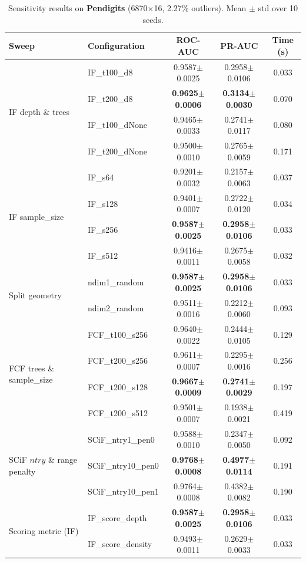\begin{table}[t]
\centering
\caption{Sensitivity results on \textbf{Pendigits} (6870$\times$16, 2.27\% outliers). Mean $\pm$ std over 10 seeds.}
\label{tab:sens-pendigits}
\scriptsize
\setlength{\tabcolsep}{4.5pt}
\renewcommand{\arraystretch}{1.15}
\begin{tabular}{llccc}
\toprule
Sweep & Configuration & ROC-AUC & PR-AUC & Time (s) \\
\midrule
\multirow{4}{*}{IF depth \& trees}
& IF\_t100\_d8    & 0.9587$\pm$0.0025 & 0.2958$\pm$0.0106 & 0.033 \\
& IF\_t200\_d8    & \textbf{0.9625$\pm$0.0006} & \textbf{0.3134$\pm$0.0030} & 0.070 \\
& IF\_t100\_dNone & 0.9465$\pm$0.0033 & 0.2741$\pm$0.0117 & 0.080 \\
& IF\_t200\_dNone & 0.9500$\pm$0.0010 & 0.2765$\pm$0.0059 & 0.171 \\
\midrule
\multirow{4}{*}{IF sample\_size}
& IF\_s64  & 0.9201$\pm$0.0032 & 0.2157$\pm$0.0063 & 0.037 \\
& IF\_s128 & 0.9401$\pm$0.0007 & 0.2722$\pm$0.0120 & 0.034 \\
& IF\_s256 & \textbf{0.9587$\pm$0.0025} & \textbf{0.2958$\pm$0.0106} & 0.033 \\
& IF\_s512 & 0.9416$\pm$0.0011 & 0.2675$\pm$0.0058 & 0.032 \\
\midrule
\multirow{2}{*}{Split geometry}
& ndim1\_random & \textbf{0.9587$\pm$0.0025} & \textbf{0.2958$\pm$0.0106} & 0.033 \\
& ndim2\_random & 0.9511$\pm$0.0016 & 0.2212$\pm$0.0060 & 0.093 \\
\midrule
\multirow{4}{*}{FCF trees \& sample\_size}
& FCF\_t100\_s256 & 0.9640$\pm$0.0022 & 0.2444$\pm$0.0105 & 0.129 \\
& FCF\_t200\_s256 & 0.9611$\pm$0.0007 & 0.2295$\pm$0.0016 & 0.256 \\
& FCF\_t200\_s128 & \textbf{0.9667$\pm$0.0009} & \textbf{0.2741$\pm$0.0029} & 0.197 \\
& FCF\_t200\_s512 & 0.9501$\pm$0.0007 & 0.1938$\pm$0.0021 & 0.419 \\
\midrule
\multirow{3}{*}{SCiF $ntry$ \& range penalty}
& SCiF\_ntry1\_pen0  & 0.9588$\pm$0.0010 & 0.2347$\pm$0.0050 & 0.092 \\
& SCiF\_ntry10\_pen0 & \textbf{0.9768$\pm$0.0008} & \textbf{0.4977$\pm$0.0114} & 0.191 \\
& SCiF\_ntry10\_pen1 & 0.9764$\pm$0.0008 & 0.4382$\pm$0.0082 & 0.190 \\
\midrule
\multirow{2}{*}{Scoring metric (IF)}
& IF\_score\_depth   & \textbf{0.9587$\pm$0.0025} & \textbf{0.2958$\pm$0.0106} & 0.033 \\
& IF\_score\_density & 0.9493$\pm$0.0011 & 0.2629$\pm$0.0033 & 0.033 \\
\bottomrule
\end{tabular}
\end{table}

